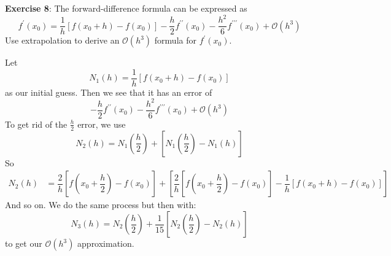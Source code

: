 \documentclass{article}
\begin{document}
\textbf{Exercise 8}: The forward-difference formula can be expressed as 
    \begin{equation*}
        f^{\prime}(x_{0}) = \dfrac{1}{h}[f(x_{0} + h) - f(x_{0})] - \dfrac{h}{2}f^{\prime\prime}(x_{0}) - \dfrac{h^{2}}{6}f^{\prime\prime\prime}(x_{0}) + \mathcal{O}(h^{3})
    \end{equation*}
Use extrapolation to derive an $\mathcal{O}(h^{3})$ formula for $f^{\prime}(x_{0})$.
    \begin{answer}
        Let 
            \begin{equation*}
                N_{1}(h) = \dfrac{1}{h}[f(x_{0} + h) - f(x_{0})]
            \end{equation*}
        as our initial guess. Then we see that it has an error of 
            \begin{equation*}
                -\dfrac{h}{2}f^{\prime\prime}(x_{0}) - \dfrac{h^{2}}{6}f^{\prime\prime\prime}(x_{0}) + \mathcal{O}(h^{3})
            \end{equation*}
        To get rid of the $\frac{h}{2}$ error, we use
            \begin{equation*}
                N_{2}(h) = N_{1}\left(\dfrac{h}{2}\right) + \left[N_{1}\left(\dfrac{h}{2}\right) - N_{1}(h)\right]
            \end{equation*}
        So
            \begin{align*}
                N_{2}(h) &= \dfrac{2}{h}\left[f\left(x_{0} + \dfrac{h}{2}\right) - f(x_{0})\right] + \left[\dfrac{2}{h}\left[f\left(x_{0} + \dfrac{h}{2}\right) - f(x_{0})\right] - \dfrac{1}{h}[f(x_{0} + h) - f(x_{0})]\right]   
            \end{align*}
        And so on. We do the same process but then with:
            \begin{equation*}
                N_{3}(h) = N_{2}\left(\dfrac{h}{2}\right) + \dfrac{1}{15}\left[N_{2}\left(\dfrac{h}{2}\right) - N_{2}(h)\right]
            \end{equation*}
        to get our $\mathcal{O}(h^{3})$ approximation.
    \end{answer}
\end{document}
